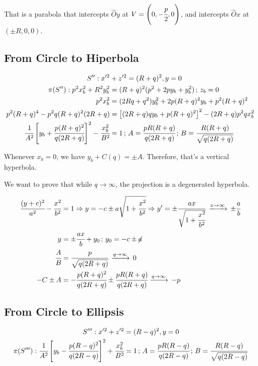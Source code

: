 \documentclass[12pt]{article}
\numberwithin{table}{section}
\begin{document}
That is a parabola that intercepts $\hat O y$ at $V = \left(0, -\cfrac{p}{2}, 0\right)$, and intercepts $\hat Ox$ at $(\pm R, 0, 0)$.

\subsection{From Circle to Hiperbola}

\begin{align}
S'': x'^2 &+ z'^2 = (R+q)^2, y = 0 \\
\pi(S''): p^2 x_b^2 + R^2 y_b^2 &= (R+q)^2 (p^2 + 2py_b +y_b^2)\,;\,z_b=0 \\
p^2x_b^2 &= (2Rq + q^2) y_b^2 + 2p(R+q)^2 y_b + p^2(R+q)^2\\
p^2(R+q)^4 - p^2q(R+q)^2(2R + q) &= \left[(2R + q)q y_b + p(R+q)^2\right]^2-(2R+q)p^2qx_b^2 \\
\cfrac{1}{A^2} \left[y_b+\cfrac{p(R+q)^2}{q(2R + q)}\right]^2-\cfrac{x_b^2}{B^2} &= 1\,;\,A = \cfrac{pR(R+q)}{q(2R+q)}\,;\,B = \cfrac{R(R+q)}{\sqrt{q(2R+q)}}
\end{align}

Whenever $x_b = 0$, we have $y_b + C(q) = \pm A$. Therefore, that's a vertical hyperbola.

We want to prove that while $q\to \infty$, the projection is a degenerated hyperbola.

\begin{align}
\cfrac{(y + c)^2}{a^2} - \cfrac{x^2}{b^2} &= 1\Rightarrow y = -c \pm a\sqrt{1 + \cfrac{x^2}{b^2}} \Rightarrow y' = \pm  \cfrac{ax}{\sqrt{1 + \cfrac{x^2}{b^2}} } \,\xrightarrow{x \to \infty}\, \pm \cfrac{a}{b} \\
y &= \pm \cfrac{ax}{b} + y_0\,;\,y_0 = -c\pm \cancel{a}\\
\cfrac{A}{B} &= \cfrac{p}{\sqrt{q(2R+q)}}\,\xrightarrow{q \to \infty}\,0\\-C\pm A &= -\cfrac{p(R+q)^2}{q(2R + q)}\pm \cfrac{pR(R+q)}{q(2R+q)}\xrightarrow{q \to \infty}\,-p
\end{align}

\subsection{From Circle to Ellipsis}

\begin{align}
S''': x'^2 + z'^2 &= (R-q)^2, y = 0 \\
\pi(S'''): \cfrac{1}{A^2} \left[y_b-\cfrac{p(R-q)^2}{q(2R - q)}\right]^2+\cfrac{x_b^2}{B^2} &= 1 \,;\,A = \cfrac{pR(R-q)}{q(2R-q)}\,;\,B = \cfrac{R(R-q)}{\sqrt{q(2R-q)}}
\end{align}
\end{document}
